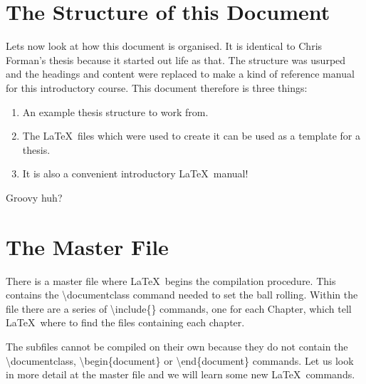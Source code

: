 \pagebreak
\section{The Structure of this Document}

Lets now look at how this document is organised. It is identical to Chris Forman's thesis because it started out life as that. The structure was usurped and the headings and content were replaced to make a kind of reference manual for this introductory course. This document therefore is three things:

\begin{enumerate}
\item An example thesis structure to work from.
\item The \LaTeX\ files which were used to create it can be used as a template for a thesis.
\item It is also a convenient introductory \LaTeX\ manual!
\end{enumerate}

\vspace*{2ex}
Groovy huh?

\section{The Master File}

There is a master file where \LaTeX\ begins the compilation procedure. This contains the {\textbackslash}documentclass command needed to set the ball rolling. Within the file there are a series of {\textbackslash}include\{\} commands, one for each Chapter, which tell \LaTeX\ where to find the files containing each chapter.

The subfiles cannot be compiled on their own because they do not contain the {\textbackslash}documentclass, {\textbackslash}begin\{document\} or {\textbackslash}end\{document\} commands. Let us look in more detail at the master file and we will learn some new \LaTeX\ commands.

